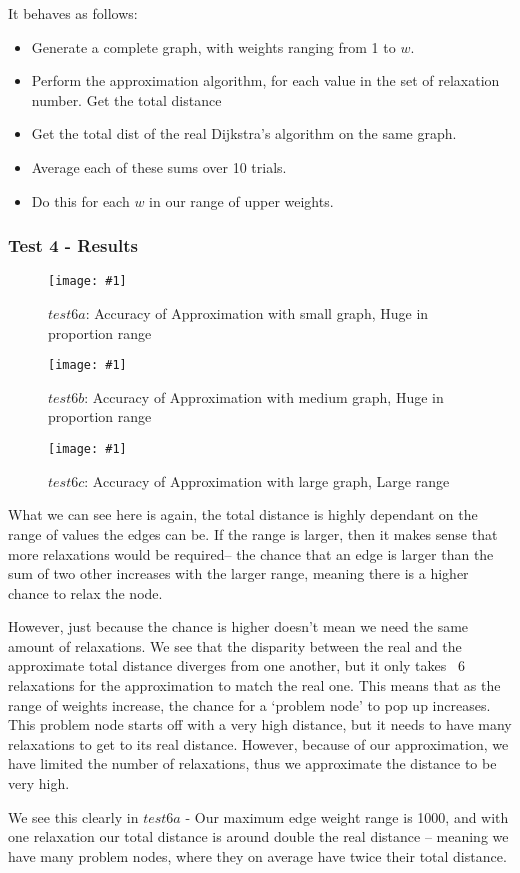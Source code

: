 \documentclass{article}
\newcommand{\figureInsetScaled}[3]
{
    \FloatBarrier{}
    \begin{figure}[ht!]
        \centering
        \texttt{[image: \#1]}
        \caption{#2}
    \end{figure}
    \FloatBarrier{}
}
\begin{document}
It behaves as follows:
\begin{itemize}
    \item Generate a complete graph, with weights ranging from 1 to $w$.
    \item Perform the approximation algorithm, for each value in the set of relaxation number. Get the total distance
    \item Get the total dist of the real Dijkstra's algorithm on the same graph.
    \item Average each of these sums over 10 trials.
    \item Do this for each $w$ in our range of upper weights.
\end{itemize}

\newpage
\subsubsection{Test 4 - Results}

\FloatBarrier{}
\figureInsetScaled{images/part1/exp1_6a.png}{$test6a$: Accuracy of Approximation with small graph, Huge in proportion range}{.5}
\figureInsetScaled{images/part1/exp1_6b.png}{$test6b$: Accuracy of Approximation with medium graph, Huge in proportion range}{.5}
\figureInsetScaled{images/part1/exp1_6c.png}{$test6c$: Accuracy of Approximation with large graph, Large range}{.5}
\FloatBarrier{}

What we can see here is again, the total distance is highly dependant on the range of values the edges can be. If the range is larger, then it makes sense that more relaxations would be required-- the chance that an edge is larger than the sum of two other increases with the larger range, meaning there is a higher chance to relax the node. 

However, just because the chance is higher doesn't mean we need the same amount of relaxations. We see that the disparity between the real and the approximate total distance diverges from one another, but it only takes ~6 relaxations for the approximation to match the real one. This means that as the range of weights increase, the chance for a `problem node' to pop up increases. This problem node starts off with a very high distance, but it needs to have many relaxations to get to its real distance. However, because of our approximation, we have limited the number of relaxations, thus we approximate the distance to be very high.

We see this clearly in $test6a$ - Our maximum edge weight range is 1000, and with one relaxation our total distance is around double the real distance -- meaning we have many problem nodes, where they on average have twice their total distance. 
\end{document}
